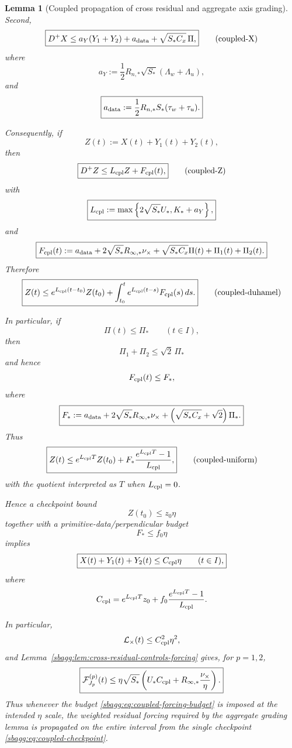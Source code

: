 \documentclass{article} %
\theoremstyle{plain}
\newtheorem{lemma}[theorem]{Lemma}
\theoremstyle{definition}
\theoremstyle{remark}
\begin{document}
\begin{lemma}[Coupled propagation of cross residual and aggregate axis grading]
Second,
\[
\boxed{
D^+X
\le
a_Y(Y_1+Y_2)
+
a_{\rm data}
+
\sqrt{S_*C_x}\,\Pi,
}
\tag{coupled-X}
\label{sbagg:eq:coupled-X}
\]
where
\[
\boxed{
a_Y
:=
\frac12
R_{n,*}\sqrt{S_*}
(\Lambda_w+\Lambda_u),
}
\]
and
\[
\boxed{
a_{\rm data}
:=
\frac12
R_{n,*}S_*
(\tau_w+\tau_u).
}
\]

Consequently, if
\[
Z(t):=X(t)+Y_1(t)+Y_2(t),
\]
then
\[
\boxed{
D^+Z
\le
L_{\rm cpl}Z
+
F_{\rm cpl}(t),
}
\tag{coupled-Z}
\label{sbagg:eq:coupled-Z}
\]
with
\[
\boxed{
L_{\rm cpl}
:=
\max\left\{
2\sqrt{S_*}U_*,
K_*+a_Y
\right\},
}
\]
and
\[
\boxed{
F_{\rm cpl}(t)
:=
a_{\rm data}
+
2\sqrt{S_*}R_{\infty,*}\nu_\times
+
\sqrt{S_*C_x}\Pi(t)
+
\Pi_1(t)+\Pi_2(t).
}
\]
Therefore
\[
\boxed{
Z(t)
\le
e^{L_{\rm cpl}(t-t_0)}Z(t_0)
+
\int_{t_0}^t
e^{L_{\rm cpl}(t-s)}
F_{\rm cpl}(s)\,ds.
}
\tag{coupled-duhamel}
\label{sbagg:eq:coupled-duhamel}
\]

In particular, if
\[
\Pi(t)\le\Pi_*
\qquad(t\in I),
\]
then
\[
\Pi_1+\Pi_2\le\sqrt2\,\Pi_*
\]
and hence
\[
F_{\rm cpl}(t)\le F_*,
\]
where
\[
\boxed{
F_*
:=
a_{\rm data}
+
2\sqrt{S_*}R_{\infty,*}\nu_\times
+
\left(
\sqrt{S_*C_x}+\sqrt2
\right)\Pi_*.
}
\]
Thus
\[
\boxed{
Z(t)
\le
e^{L_{\rm cpl}T}Z(t_0)
+
F_*
\frac{e^{L_{\rm cpl}T}-1}{L_{\rm cpl}},
}
\tag{coupled-uniform}
\label{sbagg:eq:coupled-uniform}
\]
with the quotient interpreted as $T$ when $L_{\rm cpl}=0$.

Hence a checkpoint bound
\[
\boxed{
Z(t_0)\le z_0\eta
}
\tag{coupled-checkpoint}
\label{sbagg:eq:coupled-checkpoint}
\]
together with a primitive-data/perpendicular budget
\[
\boxed{
F_*\le f_0\eta
}
\tag{coupled-forcing-budget}
\label{sbagg:eq:coupled-forcing-budget}
\]
implies
\[
\boxed{
X(t)+Y_1(t)+Y_2(t)
\le
C_{\rm cpl}\eta
\qquad
(t\in I),
}
\]
where
\[
C_{\rm cpl}
=
e^{L_{\rm cpl}T}z_0
+
f_0
\frac{e^{L_{\rm cpl}T}-1}{L_{\rm cpl}}.
\]

In particular,
\[
\mathcal L_\times(t)
\le
C_{\rm cpl}^2\eta^2,
\]
and Lemma~\ref{sbagg:lem:cross-residual-controls-forcing} gives, for $p=1,2$,
\[
\boxed{
\mathcal F_{J_p}^{(p)}(t)
\le
\eta\sqrt{S_*}
\left(
U_*C_{\rm cpl}
+
R_{\infty,*}\frac{\nu_\times}{\eta}
\right).
}
\]
Thus whenever the budget
\eqref{sbagg:eq:coupled-forcing-budget} is imposed at the intended $\eta$ scale,
the weighted residual forcing required by the aggregate grading lemma is
propagated on the entire interval from the single checkpoint
\eqref{sbagg:eq:coupled-checkpoint}.
\end{lemma}
\end{document}
